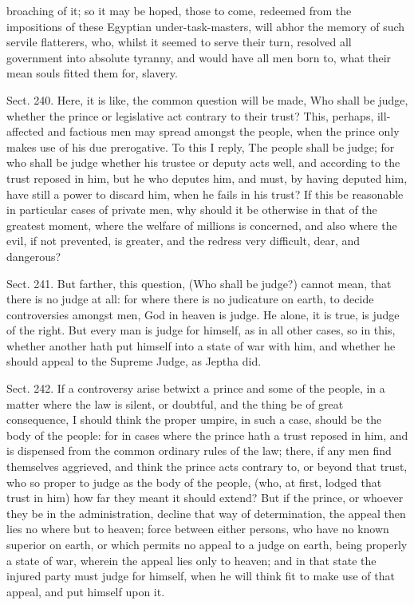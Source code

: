 \documentclass[11pt,openany]{book}
\begin{document}
broaching of it; so it may be hoped, those to come, redeemed from the impositions of these Egyptian under-task-masters, will abhor the memory of such servile flatterers, who, whilst it seemed to serve their turn, resolved all government into absolute tyranny, and would have all men born to, what their mean souls fitted them for, slavery.

Sect. 240. Here, it is like, the common question will be made, Who shall be judge, whether the prince or legislative act contrary to their trust? This, perhaps, ill-affected and factious men may spread amongst the people, when the prince only makes use of his due prerogative. To this I reply, The people shall be judge; for who shall be judge whether his trustee or deputy acts well, and according to the trust reposed in him, but he who deputes him, and must, by having deputed him, have still a power to discard him, when he fails in his trust? If this be reasonable in particular cases of private men, why should it be otherwise in that of the greatest moment, where the welfare of millions is concerned, and also where the evil, if not prevented, is greater, and the redress very difficult, dear, and dangerous?

Sect. 241. But farther, this question, (Who shall be judge?) cannot mean, that there is no judge at all: for where there is no judicature on earth, to decide controversies amongst men, God in heaven is judge. He alone, it is true, is judge of the right. But every man is judge for himself, as in all other cases, so in this, whether another hath put himself into a state of war with him, and whether he should appeal to the Supreme Judge, as Jeptha did.

Sect. 242. If a controversy arise betwixt a prince and some of the people, in a matter where the law is silent, or doubtful, and the thing be of great consequence, I should think the proper umpire, in such a case, should be the body of the people: for in cases where the prince hath a trust reposed in him, and is dispensed from the common ordinary rules of the law; there, if any men find themselves aggrieved, and think the prince acts contrary to, or beyond that trust, who so proper to judge as the body of the people, (who, at first, lodged that trust in him) how far they meant it should extend? But if the prince, or whoever they be in the administration, decline that way of determination, the appeal then lies no where but to heaven; force between either persons, who have no known superior on earth, or which permits no appeal to a judge on earth, being properly a state of war, wherein the appeal lies only to heaven; and in that state the injured party must judge for himself, when he will think fit to make use of that appeal, and put himself upon it.
\end{document}
